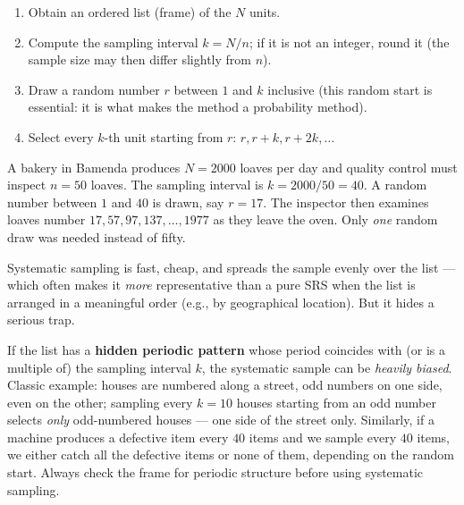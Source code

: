 \documentclass[11pt]{article}
\newcounter{popsec}
\newcounter{popsub}
\newcommand{\courssub}[1]{%
  \stepcounter{popsub}%
  \par\vspace{9pt}\noindent{\popxbold\fontsize{11.5}{13}\selectfont\color{popink}{\color{poporange}\thepopsec.\thepopsub}\hspace{6pt}#1}\par\nopagebreak\vspace{4pt}
}
\begin{document}
\begin{methode}
\begin{enumerate}
\item Obtain an ordered list (frame) of the $N$ units.
\item Compute the sampling interval $k = N/n$; if it is not an integer, round it (the sample size may then differ slightly from $n$).
\item Draw a random number $r$ between $1$ and $k$ inclusive (this random start is essential: it is what makes the method a probability method).
\item Select every $k$-th unit starting from $r$: $r, r+k, r+2k, \dots$
\end{enumerate}
\end{methode}

\begin{exemplebox}
A bakery in Bamenda produces $N = 2000$ loaves per day and quality control must inspect $n = 50$ loaves. The sampling interval is $k = 2000/50 = 40$. A random number between $1$ and $40$ is drawn, say $r = 17$. The inspector then examines loaves number $17, 57, 97, 137, \dots, 1977$ as they leave the oven. Only \emph{one} random draw was needed instead of fifty.
\end{exemplebox}

Systematic sampling is fast, cheap, and spreads the sample evenly over the list --- which often makes it \emph{more} representative than a pure SRS when the list is arranged in a meaningful order (e.g., by geographical location). But it hides a serious trap.

\begin{attention}
If the list has a \textbf{hidden periodic pattern} whose period coincides with (or is a multiple of) the sampling interval $k$, the systematic sample can be \emph{heavily biased}. Classic example: houses are numbered along a street, odd numbers on one side, even on the other; sampling every $k = 10$ houses starting from an odd number selects \emph{only} odd-numbered houses --- one side of the street only. Similarly, if a machine produces a defective item every $40$ items and we sample every $40$ items, we either catch all the defective items or none of them, depending on the random start. Always check the frame for periodic structure before using systematic sampling.
\end{attention}

\courssub{Stratified Sampling}
\end{document}
